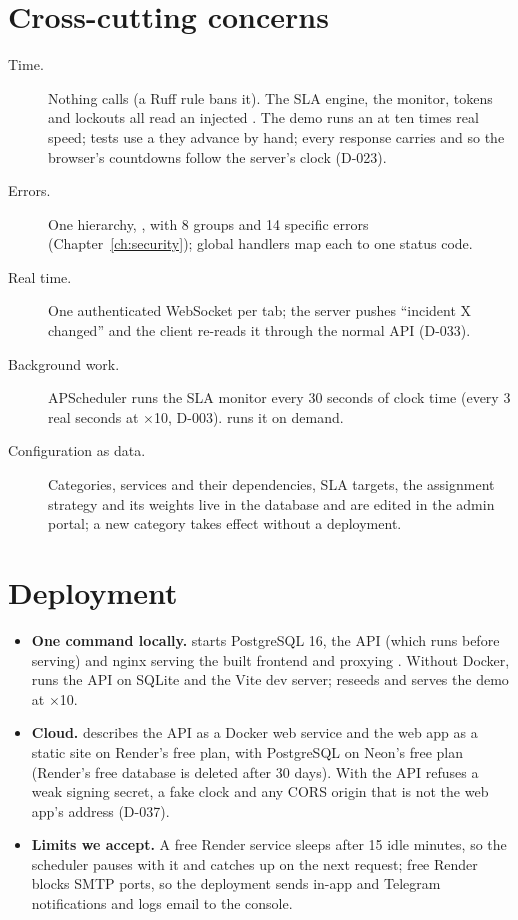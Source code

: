 \section{Cross-cutting concerns}
\begin{description}
  \item[Time.] Nothing calls  (a Ruff rule bans it). The SLA engine, the
    monitor, tokens and lockouts all read an injected . The demo runs an
     at ten times real speed; tests use a  they advance by
    hand; every response carries  and  so the browser's
    countdowns follow the server's clock (D-023).
  \item[Errors.] One hierarchy, , with 8 groups and 14 specific errors
    (Chapter~\ref{ch:security}); global handlers map each to one status code.
  \item[Real time.] One authenticated WebSocket per tab; the server pushes ``incident X
    changed'' and the client re-reads it through the normal API (D-033).
  \item[Background work.] APScheduler runs the SLA monitor every 30 seconds of clock time
    (every 3 real seconds at $\times$10, D-003).  runs it on demand.
  \item[Configuration as data.] Categories, services and their dependencies, SLA targets, the
    assignment strategy and its weights live in the database and are edited in the admin
    portal; a new category takes effect without a deployment.
\end{description}

\section{Deployment}
\begin{itemize}
  \item \textbf{One command locally.}  starts PostgreSQL 16, the API
    (which runs  before serving) and nginx serving the built
    frontend and proxying . Without Docker,  runs the API on SQLite and
    the Vite dev server;  reseeds and serves the demo at $\times$10.
  \item \textbf{Cloud.}  describes the API as a Docker web service and the web
    app as a static site on Render's free plan, with PostgreSQL on Neon's free plan (Render's
    free database is deleted after 30 days). With  the API refuses a weak
    signing secret, a fake clock and any CORS origin that is not the web app's 
    address (D-037).
  \item \textbf{Limits we accept.} A free Render service sleeps after 15 idle minutes, so the
    scheduler pauses with it and catches up on the next request; free Render blocks SMTP
    ports, so the deployment sends in-app and Telegram notifications and logs email to the
    console.
\end{itemize}


